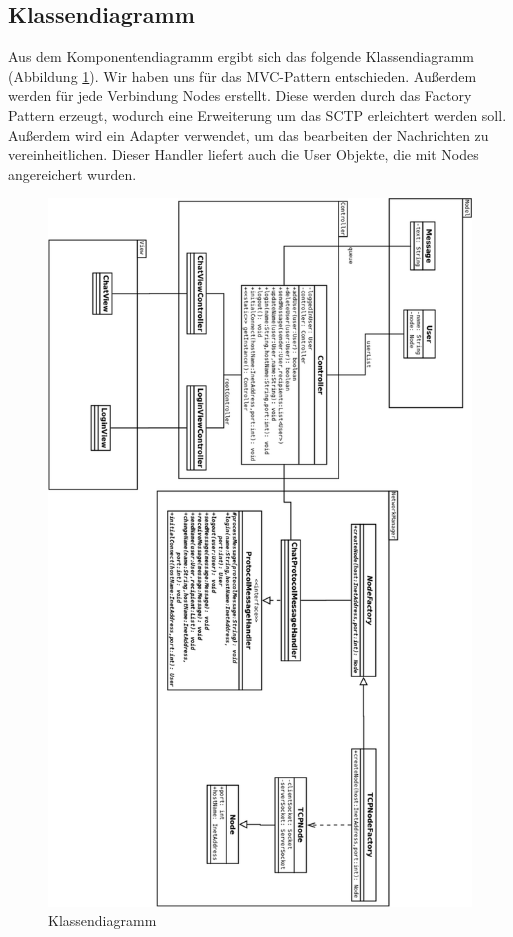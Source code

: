 \documentclass[paper=a4, fontsize=11pt]{scrreprt}
\numberwithin{equation}{section}
\numberwithin{figure}{section}
\numberwithin{table}{section}
\begin{document}
\subsection{Klassendiagramm}

Aus dem Komponentendiagramm ergibt sich das folgende Klassendiagramm (Abbildung \ref{fig:class-diagram}). Wir haben uns für das MVC-Pattern entschieden. Außerdem werden für jede Verbindung Nodes erstellt. Diese werden durch das Factory Pattern erzeugt, wodurch eine Erweiterung um das SCTP erleichtert werden soll. Außerdem wird ein Adapter verwendet, um das bearbeiten der Nachrichten zu vereinheitlichen. Dieser Handler liefert auch die User Objekte, die mit Nodes angereichert wurden. 

\begin{figure}[!htb] 
  \centering
     \includegraphics[width=1.0\textwidth]{resources/class-diagram.png}
  \caption{Klassendiagramm}
  \label{fig:class-diagram}
\end{figure}
\end{document}
